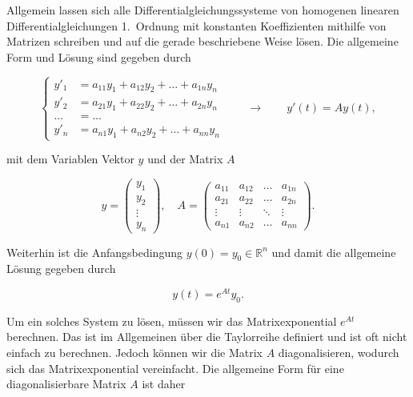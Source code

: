 \vspace{1\baselineskip}

Allgemein lassen sich alle Differentialgleichungssysteme von homogenen linearen Differentialgleichungen 1.\ Ordnung mit konstanten Koeffizienten mithilfe von Matrizen schreiben und auf die gerade beschriebene Weise lösen. Die allgemeine Form und Lösung sind gegeben durch

\begin{equation*}
    \left\{ \begin{aligned}
        y'_1 &= a_{11} y_1 + a_{12} y_2 + \ldots + a_{1n} y_n \\
        y'_2 &= a_{21} y_1 + a_{22} y_2 + \ldots + a_{2n} y_n \\
        \dots &= \dots \\
        y'_n &= a_{n1} y_1 + a_{n2} y_2 + \ldots + a_{nn} y_n
    \end{aligned} \right. \qquad \longrightarrow \qquad
    y'(t) = A y(t),
\end{equation*}

\vspace{0.25\baselineskip}

mit dem Variablen Vektor \( y \) und der Matrix \( A \)

\begin{equation*}
    y = \begin{pmatrix}
        y_1 \\
        y_2 \\
        \vdots \\
        y_n
    \end{pmatrix}, \quad A = \begin{pmatrix}
        a_{11} & a_{12} & \ldots & a_{1n} \\
        a_{21} & a_{22} & \ldots & a_{2n} \\
        \vdots & \vdots & \ddots & \vdots \\
        a_{n1} & a_{n2} & \ldots & a_{nn}
    \end{pmatrix}.
\end{equation*}
 
Weiterhin ist die Anfangsbedingung \( y(0) = y_0 \in \mathbb{R}^n \) und damit die allgemeine Lösung gegeben durch 

\begin{equation*}
    y(t) = e^{At} y_0.
\end{equation*}

Um ein solches System zu lösen, müssen wir das Matrixexponential \( e^{At} \) berechnen. Das ist im Allgemeinen über die Taylorreihe definiert und ist oft nicht einfach zu berechnen. Jedoch können wir die Matrix \( A \) diagonalisieren, wodurch sich das Matrixexponential vereinfacht. Die allgemeine Form für eine diagonalisierbare Matrix \( A \) ist daher 

